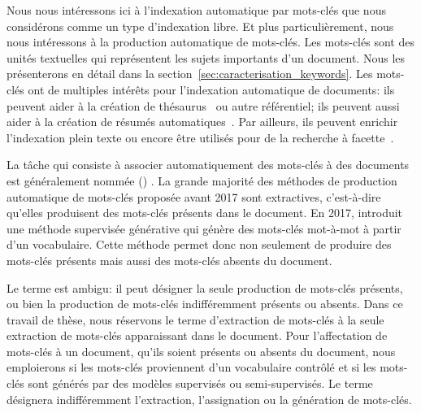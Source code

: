 
Nous nous intéressons ici à l'indexation automatique par mots-clés que nous considérons comme un type d'indexation libre. Et plus particulièrement, nous nous intéressons à la production automatique de mots-clés.
Les mots-clés sont des unités textuelles qui représentent les sujets importants d'un document. Nous les présenterons en détail dans la section~\ref{sec:caracterisation_keywords}.
Les mots-clés ont de multiples intérêts pour l'indexation automatique de documents: ils peuvent aider à la création de thésaurus~\cite{kosovac_use_2002} ou autre référentiel; ils peuvent aussi aider à la création de résumés automatiques~\cite{litvak_graph-based_2008,qazvinian_citation_2010}. Par ailleurs, ils peuvent enrichir l'indexation plein texte ou encore être utilisés pour de la recherche à facette~\cite{gutwin_improving_1999}. %

La tâche qui consiste à associer automatiquement des mots-clés à des documents est généralement nommée  () \cite{hasan_automatic_2014, meng_deep_2017}.
La grande majorité des méthodes de production automatique de mots-clés proposée avant 2017 sont extractives, c'est-à-dire qu'elles produisent des mots-clés présents dans le document.
En 2017, \citet{meng_deep_2017} introduit une méthode supervisée générative qui génère des mots-clés mot-à-mot à partir d'un vocabulaire. Cette méthode permet donc non seulement de produire des mots-clés présents mais aussi des mots-clés absents du document.

Le terme  est ambigu: il peut désigner la seule production de mots-clés présents, ou bien la production de mots-clés indifféremment présents ou absents. Dans ce travail de thèse, nous réservons le terme d'extraction de mots-clés à la seule extraction de mots-clés apparaissant dans le document. Pour l'affectation de mots-clés à un document, qu'ils soient présents ou absents du document, nous emploierons  si les mots-clés proviennent d'un vocabulaire contrôlé et  si les mots-clés sont générés par des modèles supervisés ou semi-supervisés. 
Le terme  désignera indifféremment l'extraction, l'assignation ou la génération de mots-clés.


